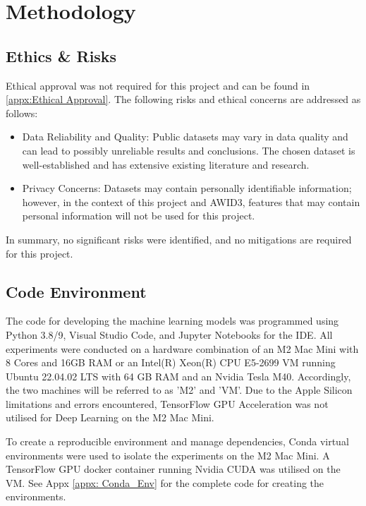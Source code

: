 
\section{Methodology}                               
\label{sec: Methodology}


\subsection{Ethics \& Risks}

Ethical approval was not required for this project and can be found in \ref{appx:Ethical Approval}. The following risks and ethical concerns are addressed as follows:
\begin{itemize}
	\item Data Reliability and Quality: Public datasets may vary in data quality and can lead to possibly unreliable results and conclusions. The chosen dataset is well-established and has extensive existing literature and research.
	\item Privacy Concerns: Datasets may contain personally identifiable information; however, in the context of this project and AWID3, features that may contain personal information will not be used for this project. 
\end{itemize}
In summary, no significant risks were identified, and no mitigations are required for this project.

\subsection{Code Environment}

The code for developing the machine learning models was programmed using Python 3.8/9, Visual Studio Code, and Jupyter Notebooks for the IDE. All experiments were conducted on a hardware combination of an M2 Mac Mini with 8 Cores and 16GB RAM or an Intel(R) Xeon(R) CPU E5-2699 VM running Ubuntu 22.04.02 LTS with 64 GB RAM and an Nvidia Tesla M40. Accordingly, the two machines will be referred to as 'M2' and 'VM'. Due to the Apple Silicon limitations and errors encountered, TensorFlow GPU Acceleration was not utilised for Deep Learning on the M2 Mac Mini.

\medskip
To create a reproducible environment and manage dependencies, Conda virtual environments \parencite{anaconda} were used to isolate the experiments on the M2 Mac Mini. A TensorFlow GPU docker container running Nvidia CUDA was utilised on the VM. See Appx \ref{appx: Conda_Env} for the complete code for creating the environments.


